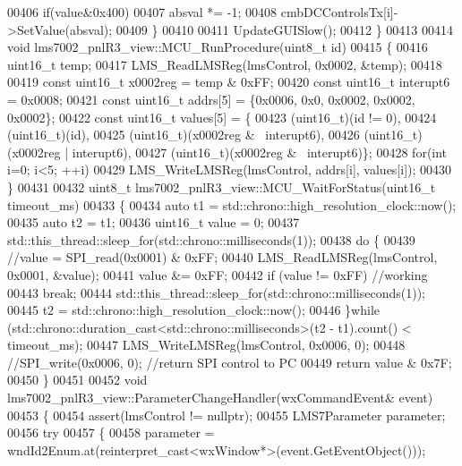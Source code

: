 \begin{DoxyCode}
{{{{00406         \textcolor{keywordflow}{if}(value&0x400)
00407             absval *= -1;
00408         cmbDCControlsTx[i]->SetValue(absval);
00409     \}
00410 
00411     UpdateGUISlow();
00412 \}
00413 
00414 \textcolor{keywordtype}{void} lms7002_pnlR3_view::MCU_RunProcedure(uint8\_t \textcolor{keywordtype}{id})
00415 \{
00416     uint16\_t temp;
00417     LMS_ReadLMSReg(lmsControl, 0x0002, &temp);
00418 
00419     \textcolor{keyword}{const} uint16\_t x0002reg = temp & 0xFF;
00420     \textcolor{keyword}{const} uint16\_t interupt6 = 0x0008;
00421     \textcolor{keyword}{const} uint16\_t addrs[5] = \{0x0006, 0x0, 0x0002, 0x0002, 0x0002\};
00422     \textcolor{keyword}{const} uint16\_t values[5] = \{
00423         (uint16\_t)(\textcolor{keywordtype}{id} != 0),
00424         (uint16\_t)(\textcolor{keywordtype}{id}),
00425         (uint16\_t)(x0002reg & ~interupt6),
00426         (uint16\_t)(x0002reg | interupt6),
00427         (uint16\_t)(x0002reg & ~interupt6)\};
00428     \textcolor{keywordflow}{for}(\textcolor{keywordtype}{int} i=0; i<5; ++i)
00429         LMS_WriteLMSReg(lmsControl, addrs[i], values[i]);
00430 \}
00431 
00432 uint8\_t lms7002_pnlR3_view::MCU_WaitForStatus(uint16\_t timeout_ms)
00433 \{
00434     \textcolor{keyword}{auto} t1 = std::chrono::high\_resolution\_clock::now();
00435     \textcolor{keyword}{auto} t2 = t1;
00436     uint16\_t value = 0;
00437     std::this\_thread::sleep\_for(std::chrono::milliseconds(1));
00438     \textcolor{keywordflow}{do} \{
00439         \textcolor{comment}{//value = SPI\_read(0x0001) & 0xFF;}
00440         LMS_ReadLMSReg(lmsControl, 0x0001, &value);
00441         value &= 0xFF;
00442         \textcolor{keywordflow}{if} (value != 0xFF) \textcolor{comment}{//working}
00443             \textcolor{keywordflow}{break};
00444         std::this\_thread::sleep\_for(std::chrono::milliseconds(1));
00445         t2 = std::chrono::high\_resolution\_clock::now();
00446     \}\textcolor{keywordflow}{while} (std::chrono::duration\_cast<std::chrono::milliseconds>(t2 - t1).count() < timeout\_ms);
00447     LMS_WriteLMSReg(lmsControl, 0x0006, 0);
00448     \textcolor{comment}{//SPI\_write(0x0006, 0); //return SPI control to PC}
00449     \textcolor{keywordflow}{return} value & 0x7F;
00450 \}
00451 
00452 \textcolor{keywordtype}{void} lms7002_pnlR3_view::ParameterChangeHandler(wxCommandEvent& event)
00453 \{
00454     assert(lmsControl != \textcolor{keyword}{nullptr});
00455     LMS7Parameter parameter;
00456     \textcolor{keywordflow}{try}
00457     \{
00458         parameter = wndId2Enum.at(reinterpret\_cast<wxWindow*>(event.GetEventObject()));
}}}}
\end{DoxyCode}
